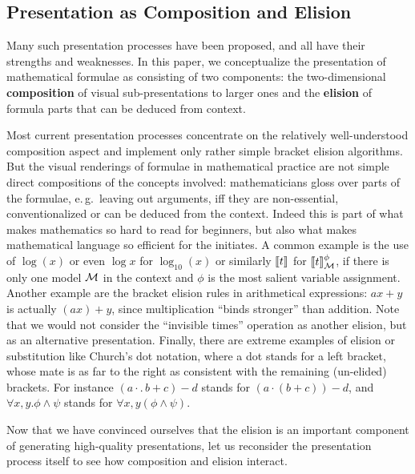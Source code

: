 \documentclass[a4paper]{article}
\def\lden{[\kern-.15em[}\def\rden{]\kern-.15em]}
\def\defemph#1{{\bf{#1}}}
\begin{document}
\subsection{Presentation as Composition and Elision}

Many such presentation processes have been proposed, and all have their strengths and
weaknesses. In this paper, we conceptualize the presentation of mathematical formulae as
consisting of two components: the two-dimensional {\defemph{composition}} of visual
sub-presentations to larger ones and the {\defemph{elision}} of formula parts that can be
deduced from context.

Most current presentation processes concentrate on the relatively well-understood
composition aspect and implement only rather simple bracket elision algorithms. But the
visual renderings of formulae in mathematical practice are not simple direct compositions
of the concepts involved: mathematicians gloss over parts of the formulae, e.\,g.\ leaving
out arguments, iff they are non-essential, conventionalized or can be deduced from the
context. Indeed this is part of what makes mathematics so hard to read for beginners, but
also what makes mathematical language so efficient for the initiates. A common example is
the use of $\log(x)$ or even $\log x$ for $\log_{10}(x)$ or similarly $\lden t\rden$ for
$\lden t\rden_{\cal M}^\phi$, if there is only one model $\cal M$ in the context and
$\phi$ is the most salient variable assignment. Another example are the bracket elision
rules in arithmetical expressions: $ax+y$ is actually $(ax)+y$, since multiplication
``binds stronger'' than addition. Note that we would not consider the ``invisible times''
operation as another elision, but as an alternative presentation. Finally, there are
extreme examples of elision or substitution like Church's dot notation, where a dot stands
for a left bracket, whose mate is as far to the right as consistent with the remaining
(un-elided) brackets. For instance $(a\cdot.\,b+c)-d$ stands for $(a\cdot(b+c))-d$, and
$\forall x,y.\phi\wedge\psi$ stands for $\forall x,y (\phi\wedge\psi)$.

Now that we have convinced ourselves that the elision is an important component of
generating high-quality presentations, let us reconsider the presentation process itself
to see how composition and elision interact.
\end{document}
